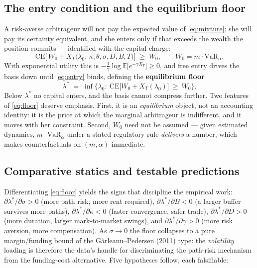 \documentclass[11pt]{article}
\newcommand{\CE}{\mathrm{CE}}
\newcommand{\VaR}{\mathrm{VaR}}
\begin{document}
\subsection{The entry condition and the equilibrium floor}

A risk-averse arbitrageur will not pay the expected value of \eqref{eq:mixture}: she will pay its certainty equivalent, and she enters only if that exceeds the wealth the position commits --- identified with the capital charge:
\begin{equation}
\CE\Big[\,W_0+X_T\big(\lambda_0;\,\kappa,\theta,\sigma,D,B,T\big)\Big]\;\ge\;W_0,
\qquad W_0=m\cdot\VaR_\alpha .
\label{eq:entry}
\end{equation}
With exponential utility this is $-\tfrac{1}{\gamma}\log\mathbb{E}\big[e^{-\gamma X_T}\big]\ge 0$, and free entry drives the basis down until \eqref{eq:entry} binds, defining the \textbf{equilibrium floor}
\begin{equation}
\lambda^\ast \;=\; \inf\Big\{\lambda_0:\ \CE\big[W_0+X_T(\lambda_0)\big]\ \ge\ W_0\Big\}.
\label{eq:floor}
\end{equation}
Below $\lambda^\ast$ no capital enters, and the basis cannot compress further. Two features of \eqref{eq:floor} deserve emphasis. First, it is an \emph{equilibrium} object, not an accounting identity: it is the price at which the marginal arbitrageur is indifferent, and it moves with her constraint. Second, $W_0$ need not be assumed --- given estimated dynamics, $m\cdot\VaR_\alpha$ under a stated regulatory rule \emph{delivers} a number, which makes counterfactuals on $(m,\alpha)$ immediate.

\subsection{Comparative statics and testable predictions}

Differentiating \eqref{eq:floor} yields the signs that discipline the empirical work: $\partial\lambda^\ast/\partial\sigma>0$ (more path risk, more rent required), $\partial\lambda^\ast/\partial B<0$ (a larger buffer survives more paths), $\partial\lambda^\ast/\partial\kappa<0$ (faster convergence, safer trade), $\partial\lambda^\ast/\partial D>0$ (more duration, larger mark-to-market swings), and $\partial\lambda^\ast/\partial\gamma>0$ (more risk aversion, more compensation). As $\sigma\to0$ the floor collapses to a pure margin/funding bound of the Gârleanu--Pedersen (2011) type: the \emph{volatility} loading is therefore the data's handle for discriminating the path-risk mechanism from the funding-cost alternative. Five hypotheses follow, each falsifiable:
\end{document}
